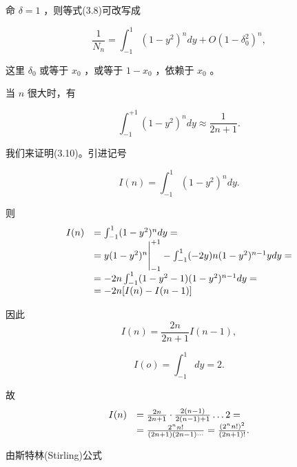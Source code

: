 命 $\delta = 1$ ，则等式(3.8)可改写成

\begin{equation*}
\frac {1}{N _ {n}} = \int_ {- 1} ^ {1} (1 - y ^ {2}) ^ {n} d y + O (1 - \delta_ {0} ^ {2}) ^ {n},\tag{3.9}
\end{equation*}

这里 $\delta_0$ 或等于 $x_0$ ，或等于 $1 - x_0$ ，依赖于 $x_0$ 。

当 $n$ 很大时，有

\begin{equation*}
\int_ {- 1} ^ {+ 1} (1 - y ^ {2}) ^ {n} d y \approx \frac {1}{2 n + 1}.\tag{3.10}
\end{equation*}

我们来证明(3.10)。引进记号

\begin{equation*}
I (n) = \int_ {- 1} ^ {1} (1 - y ^ {2}) ^ {n} d y.
\end{equation*}

则
\begin{equation*}
\begin{array}{r l} I (n) & = \int_ {- 1} ^ {1} (1 - y ^ {2}) ^ {n} d y = \\ & = y (1 - y ^ {2}) ^ {n} \Bigg | _ {- 1} ^ {+ 1} - \int_ {- 1} ^ {1} (- 2 y) n (1 - y ^ {2}) ^ {n - 1} y d y = \\ & = - 2 n \int_ {- 1} ^ {1} (1 - y ^ {2} - 1) (1 - y ^ {2}) ^ {n - 1} d y = \\ & = - 2 n [ I (n) - I (n - 1) ] \end{array}
\end{equation*}

因此
\begin{equation*}
I (n) = \frac {2 n}{2 n + 1} I (n - 1),
\end{equation*}

\begin{equation*}
I (o) = \int_ {- 1} ^ {1} d y = 2.
\end{equation*}

故
\begin{equation*}
\begin{array}{r l} I (n) & = \frac {2 n}{2 n + 1} \cdot \frac {2 (n - 1)}{2 (n - 1) + 1} \dots 2 = \\ & = \frac {2 ^ {n} n !}{(2 n + 1) (2 n - 1) \cdots} = \frac {(2 ^ {n} n !) ^ {2}}{(2 n + 1) !}. \end{array}
\end{equation*}

由斯特林(Stirling)公式


